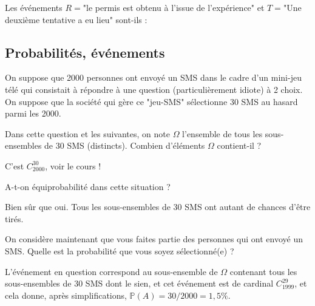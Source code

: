 \begin{question}
Les événements $R=$"le permis est obtenu à l'issue de l'expérience" et $T=$"Une deuxième tentative a eu lieu" sont-ils :
\begin{answers}
\end{answers}
\end{question}


\subsection{Probabilités, événements}


On suppose que 2000 personnes ont envoyé un SMS dans le cadre d'un mini-jeu télé qui consistait à répondre à une question (particulièrement idiote) à 2 choix. On suppose que la société qui gère ce "jeu-SMS" sélectionne 30 SMS au hasard parmi les 2000. 


\begin{question}
Dans cette question et les suivantes, on note $\Omega$ l'ensemble de tous les sous-ensembles de 30 SMS (distincts). Combien d'éléments $\Omega$ contient-il ?
\begin{answers}
\end{answers}
\begin{explanations}
C'est $C_{2000}^{30}$, voir le cours !
\end{explanations}
\end{question}


\begin{question}
A-t-on équiprobabilité dans cette situation ?
\begin{answers}
\end{answers}
\begin{explanations}
Bien sûr que oui. Tous les sous-ensembles de 30 SMS ont autant de chances d'être tirés.
\end{explanations}
\end{question}


\begin{question}
On considère maintenant que vous faites partie des personnes qui ont envoyé un SMS. Quelle est la probabilité que vous soyez sélectionné(e) ?
\begin{answers}
\end{answers}
\begin{explanations}
L'événement en question correspond au sous-ensemble de $\Omega$ contenant tous les sous-ensembles de 30 SMS dont le sien, et cet événement est de cardinal $C_{1999}^{29}$, et cela donne, après simplifications, $\mathbb{P}(A) = 30/2000 = 1,5\%$.
\end{explanations}
\end{question}


